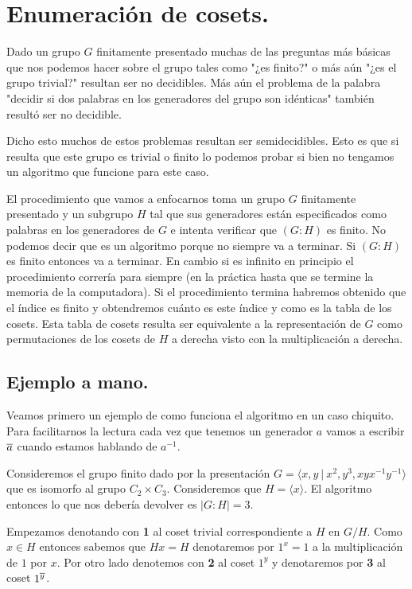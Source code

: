 \documentclass[tesis.tex]{subfiles}
\newcommand{\fp}{finitamente presentado }
\begin{document}
\chapter{Enumeración de cosets.}

Dado un grupo $G$ \fp muchas de las preguntas más básicas que nos podemos hacer sobre el grupo tales como "¿es finito?" o más aún "¿es el grupo trivial?" resultan ser no decidibles.
Más aún el problema de la palabra "decidir si dos palabras en los generadores del grupo son idénticas" también resultó ser no decidible.

Dicho esto muchos de estos problemas resultan ser semidecidibles.
Esto es que si resulta que este grupo es trivial o finito lo podemos probar si bien no tengamos un algoritmo que funcione para este caso.

El procedimiento que vamos a enfocarnos toma un grupo $G$ \fp y un subgrupo $H$ tal que sus generadores están especificados como palabras en los generadores de $G$ e intenta verificar que $(G:H)$ es finito.
No podemos decir que es un algoritmo porque no siempre va a terminar.
Si $(G:H)$ es finito entonces va a terminar.
En cambio si es infinito en principio el procedimiento correría para siempre (en la práctica hasta que se termine la memoria de la computadora).
Si el procedimiento termina habremos obtenido que el índice es finito y obtendremos cuánto es este índice y como es la tabla de los cosets.
Esta tabla de cosets resulta ser equivalente a la representación de $G$ como permutaciones de los cosets de $H$ a derecha visto con la multiplicación a derecha.

\section{Ejemplo a mano.}

Veamos primero un ejemplo de como funciona el algoritmo en un caso chiquito.
Para facilitarnos la lectura cada vez que tenemos un generador $a$ vamos a escribir $\overline a$ cuando estamos hablando de $a^{-1}$.

Consideremos el grupo finito dado por la presentación $G = \langle x , y \ | \ x^2, y^3, xyx^{-1}y^{-1} \rangle$ que es isomorfo al grupo $C_2 \times C_3$. 
Consideremos que $H = \langle x \rangle $.
El algoritmo entonces lo que nos debería devolver es $|G:H| = 3$.

Empezamos denotando con \textbf{1} al coset trivial correspondiente a $H$ en $G/H$.
Como $x \in H$ entonces sabemos que $Hx = H$ denotaremos por $1^x = 1$ a la multiplicación de $1$ por $x$.
Por otro lado denotemos con \textbf{2} al coset $1^y$ y denotaremos por \textbf{3} al coset $1^{\overline y}$.
\end{document}
